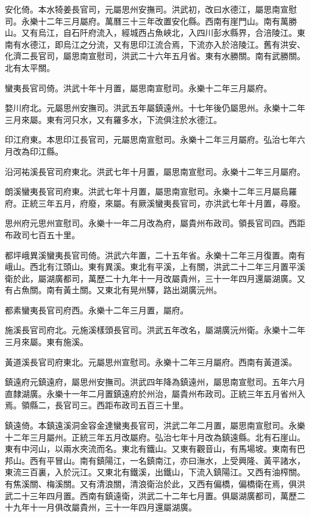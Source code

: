 安化倚。本水犄姜長官司，元屬思州安撫司。洪武初，改曰水德江，屬思南宣慰司。永樂十二年三月屬府。萬曆三十三年改置安化縣。西南有崖門山。南有萬勝山。又有烏江，自石阡府流入，經城西占魚峽北，入四川彭水縣界，合涪陵江。東南有水德江，即烏江之分流，又有思印江流合焉，下流亦入於涪陵江。舊有洪安、化濟二長官司，屬思南宣慰司，洪武二十六年五月省。東有水勝關。南有武勝關。北有太平關。

蠻夷長官司倚。洪武十年十月置，屬思南宣慰司。永樂十二年三月屬府。

婺川府北。元屬思州安撫司。洪武五年屬鎮遠州。十七年後仍屬思州。永樂十二年三月來屬。東有河只水，又有羅多水，下流俱注於水德江。

印江府東。本思印江長官司，元屬思南宣慰司。永樂十二年三月屬府。弘治七年六月改為印江縣。

沿河祐溪長官司府東北。洪武七年十月置，屬思南宣慰司。永樂十二年三月屬府。

朗溪蠻夷長官司府東。洪武七年十月置，屬思南宣慰司。永樂十二年三月屬烏羅府。正統三年五月，府廢，來屬。有厥溪蠻夷長官司，亦洪武七年十月置，尋廢。

思州府元思州宣慰司。永樂十一年二月改為府，屬貴州布政司。領長官司四。西距布政司七百五十里。

都坪峨異溪蠻夷長官司倚。洪武六年置，二十五年省。永樂十二年三月復置。南有峨山。西北有江頭山。東有異溪。東北有平溪，上有關，洪武二十二年三月置平溪衛於此，屬湖廣都司，萬歷二十九年十一月改屬貴州，三十一年四月還屬湖廣。又有占魚關。南有黃土關。又東北有晃州驛，路出湖廣沅州。

都素蠻夷長官司府西。永樂十二年三月置，屬府。

施溪長官司府北。元施溪樣頭長官司。洪武五年改名，屬湖廣沅州衛。永樂十二年三月來屬。東有施溪。

黃道溪長官司府東北。元屬思州宣慰司。永樂十二年三月屬府。西南有黃道溪。

鎮遠府元鎮遠府，屬思州安撫司。洪武四年降為鎮遠州，屬思南宣慰司。五年六月直隸湖廣。永樂十一年二月置鎮遠府於州治，屬貴州布政司。正統三年五月省州入焉。領縣二，長官司三。西距布政司五百三十里。

鎮遠倚。本鎮遠溪洞金容金達蠻夷長官司，洪武二年二月置，屬思南宣慰司。永樂十二年三月屬州。正統三年五月改屬府。弘治七年十月改為鎮遠縣。北有石崖山。東有中河山，以兩水夾流而名。東北有鐵山。又東有觀音山，有馬場坡。東南有巴邦山。西有平冒山。南有鎮陽江，一名鎮南江，亦曰潕水，上受興隆、黃平諸水，東流三百裏，入於沅江。又東北有鐵溪，出鐵山，下流入鎮陽江。又西有油榨關。有焦溪關、梅溪關。又有清浪關，清浪衛治於此，又西有偏橋，偏橋衛在焉，俱洪武二十三年四月置。西南有鎮遠衛，洪武二十二年七月置。俱屬湖廣都司，萬歷二十九年十一月俱改屬貴州，三十一年四月還屬湖廣。

